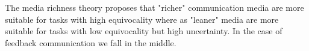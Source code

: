 \documentclass[conference]{IEEEtran}
\begin{document}
The media richness theory proposes that "richer" communication media are more suitable for tasks with high equivocality where as "leaner" media are more suitable for tasks with low equivocality but high uncertainty. \cite{1999dennis} In the case of feedback communication we fall in the middle.

\begin{comment}
\textbf{TODO: Onko palaute yksiselitteisesti equivocality? MST:n mukaan ollaan hieman toisilla jäljillä}

\textbf{TODO: Lue MRT uudestaan ja koita ymmärtää onko just näin. Lue myös Korkalaa ja Bhaleraoa, jotka ovat käyttäneet ko. teoriaa}

In iterative software development various communication phases occur in an iteration. According to Bhalerao these phases are primary, mid- and end-iteration phases. \cite{2010bhalerao}

The primary phases consist of planning tasks. Before the feature implementation, the development team and the customer have to form a shared understanding of what will be implemented. As the consensus is formed it is agreed or documented as a specification for the implementation. In this phase high uncertainty and high equivocality exists. 

In the mid-iteration phase the implementation of the agreed features for the iteration has started. Mid-iteration communication consist of corrective questions regarding the specification. Uncertainty is high while equivocality is low since the high-level consensus has been formed in the previous phase. As the development team starts delivering implemented features feedback communication takes place.

The end-iteration communication consist of feedback communication. The primary task in this phase is to validate the implemtented features. The main method for validation is an iteration demo and customer feedback.

The feedback the customer gives can be unambigious. When a developer interprets the feedback received from customer multiple questions may arise: Are we talking about the same part of the software? Why is this a problem in the first place? How it should be fixed?

Since the feedback can be unambigous and difficult to interpret it can be argued that high equivocality involves in feedback communication. According to media richness theory rich communication methods should be used in feedback communication. Also Bhalerao suggegests the same by arguing that face-to-face communication is the preferred mode for feedback communication for instant feedback \cite{2010bhalerao}.

\end{comment}
\end{document}
